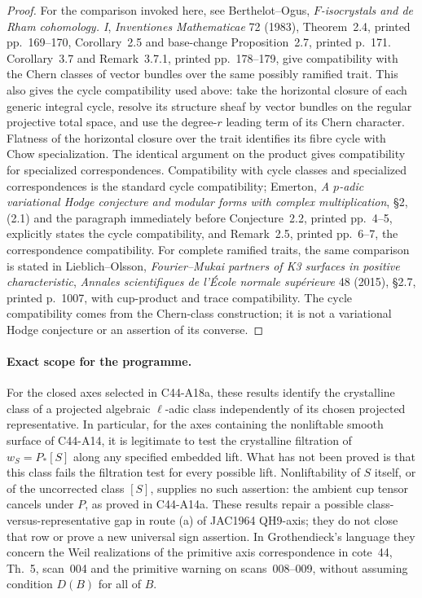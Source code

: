 \documentclass[11pt]{article}
\theoremstyle{remark}\newtheorem{remark}[theorem]{Remark}
\begin{document}
\begin{proof}
For the comparison invoked here, see Berthelot--Ogus,
\emph{$F$-isocrystals and de Rham cohomology. I},
\emph{Inventiones Mathematicae} 72 (1983), Theorem~2.4,
printed pp.~169--170, Corollary~2.5 and base-change
Proposition~2.7, printed p.~171. Corollary~3.7 and
Remark~3.7.1, printed pp.~178--179, give compatibility with
the Chern classes of vector bundles over the same possibly
ramified trait. This also gives the cycle compatibility used
above: take the horizontal closure of each generic integral
cycle, resolve its structure sheaf by vector bundles on the
regular projective total space, and use the degree-$r$ leading
term of its Chern character. Flatness of the horizontal closure
over the trait identifies its fibre cycle with Chow
specialization. The identical argument on the product gives
compatibility for specialized correspondences.
Compatibility with cycle
classes and specialized correspondences is the standard cycle
compatibility; Emerton, \emph{A $p$-adic variational Hodge
conjecture and modular forms with complex multiplication},
\S2, (2.1) and the paragraph immediately before Conjecture~2.2,
printed pp.~4--5, explicitly states the cycle compatibility,
and Remark~2.5, printed pp.~6--7, the correspondence compatibility.
For complete ramified traits, the same comparison is stated in
Lieblich--Olsson, \emph{Fourier--Mukai partners of K3 surfaces in
positive characteristic}, \emph{Annales scientifiques de
l'\'Ecole normale sup\'erieure} 48 (2015), \S2.7, printed p.~1007,
with cup-product and trace compatibility. The cycle compatibility
comes from the Chern-class construction; it is not a variational
Hodge conjecture or an assertion of its converse.
\end{proof}

\paragraph{Exact scope for the programme.}
For the closed axes selected in C44-A18a, these results identify
the crystalline class of a projected algebraic $\ell$-adic class
independently of its chosen projected representative. In particular,
for the axes containing the nonliftable smooth surface of C44-A14,
it is legitimate to test the crystalline filtration of
$w_S=P_*[S]$ along any specified embedded lift. What has not been
proved is that this class fails the filtration test for every
possible lift. Nonliftability of $S$ itself, or of the uncorrected
class $[S]$, supplies no such assertion: the ambient cup tensor
cancels under $P$, as proved in C44-A14a. These results repair a
possible class-versus-representative gap in route (a) of
JAC1964 QH9-axis; they do not close that row or prove a new
universal sign assertion. In Grothendieck's language they concern
the Weil realizations of the primitive axis correspondence in
cote~44, Th.~5, scan~004 and the primitive warning on scans~008--009,
without assuming condition $D(B)$ for all of $B$.
\end{document}
